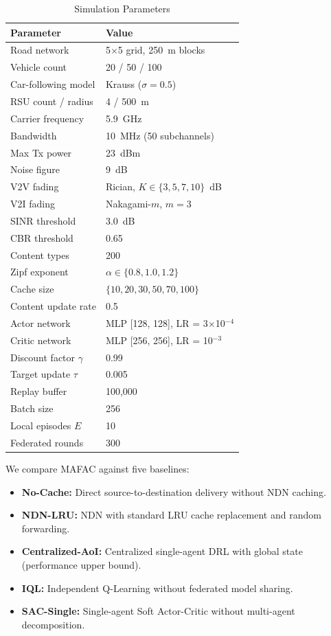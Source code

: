 \documentclass[journal]{IEEEtran}
\begin{document}
\begin{table}[!t]
\centering
\caption{Simulation Parameters}
\label{tab:sim_params}
\begin{tabular}{l l}
\toprule
\textbf{Parameter} & \textbf{Value} \\
\midrule
Road network & 5$\times$5 grid, 250~m blocks \\
Vehicle count & 20 / 50 / 100 \\
Car-following model & Krauss ($\sigma = 0.5$) \\
RSU count / radius & 4 / 500~m \\
Carrier frequency & 5.9~GHz \\
Bandwidth & 10~MHz (50 subchannels) \\
Max Tx power & 23~dBm \\
Noise figure & 9~dB \\
V2V fading & Rician, $K \in \{3, 5, 7, 10\}$~dB \\
V2I fading & Nakagami-$m$, $m = 3$ \\
SINR threshold & 3.0~dB \\
CBR threshold & 0.65 \\
Content types & 200 \\
Zipf exponent & $\alpha \in \{0.8, 1.0, 1.2\}$ \\
Cache size & $\{10, 20, 30, 50, 70, 100\}$ \\
Content update rate & 0.5 \\
Actor network & MLP [128, 128], LR = 3$\times$10$^{-4}$ \\
Critic network & MLP [256, 256], LR = 10$^{-3}$ \\
Discount factor $\gamma$ & 0.99 \\
Target update $\tau$ & 0.005 \\
Replay buffer & 100,000 \\
Batch size & 256 \\
Local episodes $E$ & 10 \\
Federated rounds & 300 \\
\bottomrule
\end{tabular}
\end{table}

We compare MAFAC against five baselines:
\begin{itemize}
\item \textbf{No-Cache:} Direct source-to-destination delivery without NDN caching.
\item \textbf{NDN-LRU:} NDN with standard LRU cache replacement and random forwarding.
\item \textbf{Centralized-AoI:} Centralized single-agent DRL with global state (performance upper bound).
\item \textbf{IQL:} Independent Q-Learning without federated model sharing.
\item \textbf{SAC-Single:} Single-agent Soft Actor-Critic without multi-agent decomposition.
\end{itemize}
\end{document}
